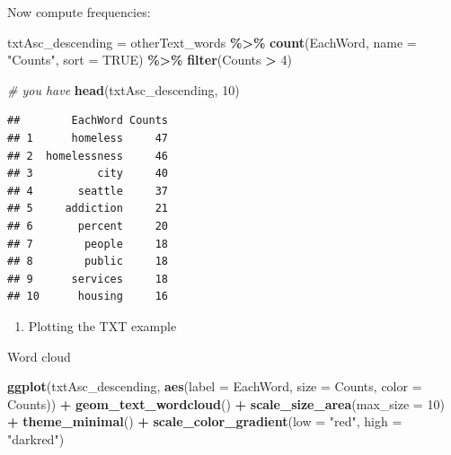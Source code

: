 \documentclass[
]{article}
\newenvironment{Shaded}{\begin{snugshade}}{\end{snugshade}}
\newcommand{\AttributeTok}[1]{\textcolor[rgb]{0.13,0.29,0.53}{#1}}
\newcommand{\CommentTok}[1]{\textcolor[rgb]{0.56,0.35,0.01}{\textit{#1}}}
\newcommand{\ConstantTok}[1]{\textcolor[rgb]{0.56,0.35,0.01}{#1}}
\newcommand{\DecValTok}[1]{\textcolor[rgb]{0.00,0.00,0.81}{#1}}
\newcommand{\FunctionTok}[1]{\textcolor[rgb]{0.13,0.29,0.53}{\textbf{#1}}}
\newcommand{\NormalTok}[1]{#1}
\newcommand{\OtherTok}[1]{\textcolor[rgb]{0.56,0.35,0.01}{#1}}
\newcommand{\SpecialCharTok}[1]{\textcolor[rgb]{0.81,0.36,0.00}{\textbf{#1}}}
\newcommand{\StringTok}[1]{\textcolor[rgb]{0.31,0.60,0.02}{#1}}
\providecommand{\tightlist}{%
  \setlength{\itemsep}{0pt}\setlength{\parskip}{0pt}}
\begin{document}
Now compute frequencies:

\begin{Shaded}
\begin{Highlighting}[]
\NormalTok{txtAsc\_descending }\OtherTok{=}\NormalTok{ otherText\_words }\SpecialCharTok{\%\textgreater{}\%}
  \FunctionTok{count}\NormalTok{(EachWord, }\AttributeTok{name =} \StringTok{"Counts"}\NormalTok{, }\AttributeTok{sort =} \ConstantTok{TRUE}\NormalTok{) }\SpecialCharTok{\%\textgreater{}\%}
  \FunctionTok{filter}\NormalTok{(Counts }\SpecialCharTok{\textgreater{}} \DecValTok{4}\NormalTok{)}

\CommentTok{\# you have}
\FunctionTok{head}\NormalTok{(txtAsc\_descending, }\DecValTok{10}\NormalTok{)}
\end{Highlighting}
\end{Shaded}

\begin{verbatim}
##        EachWord Counts
## 1      homeless     47
## 2  homelessness     46
## 3          city     40
## 4       seattle     37
## 5     addiction     21
## 6       percent     20
## 7        people     18
## 8        public     18
## 9      services     18
## 10      housing     16
\end{verbatim}

\begin{enumerate}
\def\labelenumi{\arabic{enumi}.}
\setcounter{enumi}{10}
\tightlist
\item
  Plotting the TXT example
\end{enumerate}

Word cloud

\begin{Shaded}
\begin{Highlighting}[]
\FunctionTok{ggplot}\NormalTok{(txtAsc\_descending,}
       \FunctionTok{aes}\NormalTok{(}\AttributeTok{label =}\NormalTok{ EachWord,}
           \AttributeTok{size =}\NormalTok{ Counts,}
           \AttributeTok{color =}\NormalTok{ Counts)) }\SpecialCharTok{+}
  \FunctionTok{geom\_text\_wordcloud}\NormalTok{() }\SpecialCharTok{+}
  \FunctionTok{scale\_size\_area}\NormalTok{(}\AttributeTok{max\_size =} \DecValTok{10}\NormalTok{) }\SpecialCharTok{+}
  \FunctionTok{theme\_minimal}\NormalTok{() }\SpecialCharTok{+}
  \FunctionTok{scale\_color\_gradient}\NormalTok{(}\AttributeTok{low =} \StringTok{"red"}\NormalTok{, }\AttributeTok{high =} \StringTok{"darkred"}\NormalTok{)}
\end{Highlighting}
\end{Shaded}
\end{document}

